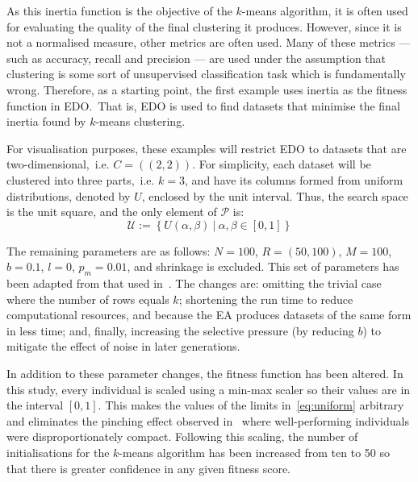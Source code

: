 As this inertia function is the objective of the \(k\)-means algorithm, it is
often used for evaluating the quality of the final clustering it produces.
However, since it is not a normalised measure, other metrics are often used.
Many of these metrics --- such as accuracy, recall and precision --- are used
under the assumption that clustering is some sort of unsupervised classification
task which is fundamentally wrong. Therefore, as a starting point, the first
example uses inertia as the fitness function in EDO.\ That is, EDO is used to
find datasets that minimise the final inertia found by \(k\)-means clustering.


For visualisation purposes, these examples will restrict EDO to datasets that
are two-dimensional,~i.e. \(C = ((2, 2))\). For simplicity, each dataset
will be clustered into three parts,~i.e. \(k = 3\), and have its columns formed
from uniform distributions, denoted by \(U\), enclosed by the unit interval.
Thus, the search space is the unit square, and the only element of
\(\mathcal{P}\) is:
\begin{equation}\label{eq:uniform}
    \mathcal{U} := \left\{U(\alpha, \beta)~|~\alpha, \beta \in [0, 1]\right\}
\end{equation}

The remaining parameters are as follows: \(N=100\), \(R=(50,100)\), \(M=100\),
\(b=0.1\), \(l=0\), \(p_m=0.01\), and shrinkage is excluded. This set of
parameters has been adapted from that used in~\cite{Wilde2020:edo}. The changes
are: omitting the trivial case where the number of rows equals \(k\); shortening
the run time to reduce computational resources, and because the EA produces
datasets of the same form in less time; and, finally, increasing the selective
pressure (by reducing \(b\)) to mitigate the effect of noise in later
generations.

In addition to these parameter changes, the fitness function has been altered.
In this study, every individual is scaled using a min-max scaler so their values
are in the interval \(\left[0, 1\right]\). This makes the values of the limits
in~\eqref{eq:uniform} arbitrary and eliminates the pinching effect observed
in~\cite{Wilde2020:edo} where well-performing individuals were
disproportionately compact. Following this scaling, the number of
initialisations for the \(k\)-means algorithm has been increased from ten to 50
so that there is greater confidence in any given fitness score.

